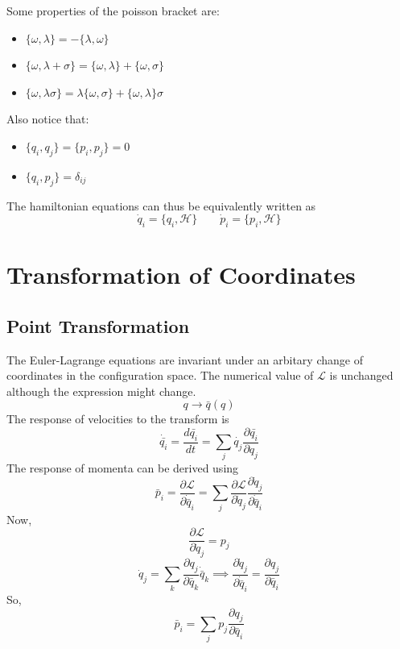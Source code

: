 \documentclass[12pt,a4paper]{report}
\newcommand{\der}[2]{\frac{d#1}{d#2}}
\newcommand{\parder}[2]{\frac{\partial#1}{\partial#2}}
\newcommand{\lagrangian}{\mathcal{L}}
\newcommand{\hamiltonian}{\mathcal{H}}
\begin{document}
Some properties of the poisson bracket are:
\begin{itemize}
    \item $\{\omega, \lambda\} = -\{\lambda, \omega\}$
    \item $\{\omega, \lambda + \sigma\} = \{\omega, \lambda\} + \{\omega, \sigma\}$
    \item $\{\omega, \lambda\sigma\} = \lambda\{\omega, \sigma\} + \{\omega, \lambda\}\sigma$
\end{itemize}

Also notice that:
\begin{itemize}
    \item $\{q_i, q_j\} = \{p_i, p_j\} = 0$
    \item $\{q_i, p_j\} = \delta_{ij}$
\end{itemize}

The hamiltonian equations can thus be equivalently written as
\begin{equation*}
    \dot{q}_i = \{q_i, \hamiltonian\} \qquad \dot{p}_i = \{p_i, \hamiltonian\}
\end{equation*}

\section{Transformation of Coordinates}

\subsection{Point Transformation}

The Euler-Lagrange equations are invariant under an arbitary change of coordinates in the configuration space.
The numerical value of $\lagrangian$ is unchanged although the expression might change.
\begin{equation*}
    q \to \bar{q}(q)
\end{equation*}
The response of velocities to the transform is
\begin{equation*}
    \dot{\bar{q_i}} = \der{\bar{q_i}}{t} = \sum_{j}\dot{q_j} \parder{\bar{q_i}}{q_j}
\end{equation*}
The response of momenta can be derived using
\begin{equation*}
    \bar{p}_i = \parder{\lagrangian}{\dot{\bar{q}}_i} = \sum_j \parder{\lagrangian}{\dot{q}_j} \parder{\dot{q}_j}{\dot{\bar{q}}_i}
\end{equation*}
Now,
\begin{equation*}
    \parder{\lagrangian}{\dot{q}_j} = p_j
\end{equation*}
\begin{equation*}
    \dot{q}_j = \sum_k \parder{q_j}{\bar{q}_k} \dot{\bar{q}}_k \implies \parder{\dot{q}_j}{\dot{\bar{q}}_i} = \parder{q_j}{\bar{q}_i}
\end{equation*}
So,
\begin{equation*}
    \bar{p}_i = \sum_j p_j \parder{q_j}{\bar{q}_i}
\end{equation*}
\end{document}
